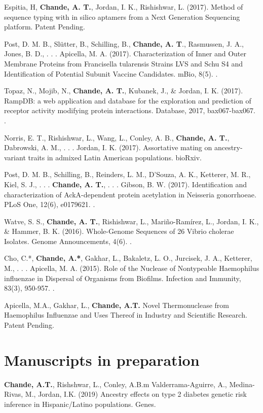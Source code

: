 \documentclass[11pt,letterpaper,sans]{moderncv} %
\begin{document}
\begin{etaremune}
\item Espitia, H, \textbf{Chande, A. T.}, Jordan, I. K., Rishishwar, L. (2017). Method of sequence typing with in silico aptamers from a Next Generation Sequencing platform. Patent Pending.
\item Post, D. M. B., Sl{\"u}tter, B., Schilling, B., \textbf{Chande, A. T}., Rasmussen, J. A., Jones, B. D., . . . Apicella, M. A. (2017). Characterization of Inner and Outer Membrane Proteins from Francisella tularensis Strains LVS and Schu S4 and Identification of Potential Subunit Vaccine Candidates. mBio, 8(5). . 
\item Topaz, N., Mojib, N., \textbf{Chande, A. T.}, Kubanek, J., \& Jordan, I. K. (2017). RampDB: a web application and database for the exploration and prediction of receptor activity modifying protein interactions. Database, 2017, bax067-bax067. . 
\item Norris, E. T., Rishishwar, L., Wang, L., Conley, A. B., \textbf{Chande, A. T.}, Dabrowski, A. M., . . . Jordan, I. K. (2017). Assortative mating on ancestry-variant traits in admixed Latin American populations. bioRxiv. 
\item Post, D. M. B., Schilling, B., Reinders, L. M., D'Souza, A. K., Ketterer, M. R., Kiel, S. J., . . . \textbf{Chande, A. T.}, . . . Gibson, B. W. (2017). Identification and characterization of AckA-dependent protein acetylation in Neisseria gonorrhoeae. PLoS One, 12(6), e0179621. . 
\item Watve, S. S., \textbf{Chande, A. T.}, Rishishwar, L., Mari{\~{n}}o-Ram{{\'i}}rez, L., Jordan, I. K., \& Hammer, B. K. (2016). Whole-Genome Sequences of 26 Vibrio cholerae Isolates. Genome Announcements, 4(6). . 
\item Cho, C.*,\textbf{ Chande, A.*}, Gakhar, L., Bakaletz, L. O., Jurcisek, J. A., Ketterer, M., . . . Apicella, M. A. (2015). Role of the Nuclease of Nontypeable Haemophilus influenzae in Dispersal of Organisms from Biofilms. Infection and Immunity, 83(3), 950-957. .  
\item Apicella, M.A., Gakhar, L., \textbf{Chande, A.T.}  Novel Thermonuclease from Haemophilus Influenzae and Uses Thereof in Industry and Scientific Research. Patent Pending.
\end{etaremune}

\section{Manuscripts in preparation}

\begin{etaremune}
\item \textbf{Chande, A.T.}, Rishshwar, L., Conley, A.B.m Valderrama-Aguirre, A., Medina-Rivas, M., Jordan, I.K. (2019) Ancestry effects on type 2 diabetes genetic risk inference in Hispanic/Latino populations. Genes.
\end{etaremune}
\end{document}
